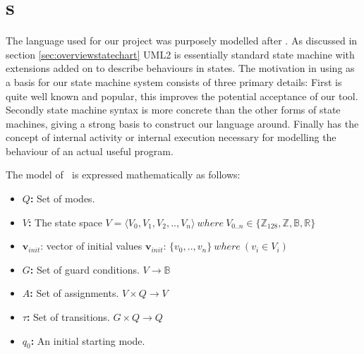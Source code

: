 \section{\plcchart s}
\label{sec:statechartsem}

The language used for our project was purposely modelled after \cite{UML2}. As discussed in section \ref{sec:overviewstatechart} UML2 is essentially standard state machine with extensions added on to describe behaviours in states. The motivation in using \cite{UML2} as a basis for our state machine system consists of three primary details: First \cite{UML2} is quite well known and popular, this improves the potential acceptance of our tool. Secondly \cite{UML2} state machine syntax is more concrete than the other forms of state machines, giving a strong basis to construct our language around. Finally \cite{UML2} has the concept of internal activity or internal execution necessary for modelling the behaviour of an actual useful program.

The model of \plcchart $\:$ is expressed mathematically as follows:

\begin{definition}
	\plcchart
	
\begin{itemize}
	\item \textbf{$Q$:} Set of modes.
	\item \textbf{$V$:} The state space $V = \langle V_0,V_1,V_2,..,V_n \rangle \: where \: V_{0..n}\in \lbrace \mathbb{Z}_{128}, \mathbb{Z}, \mathbb{B}, \mathbb{R} \rbrace$
	\item $\mathbf{v}_{init}$: vector of initial values $\mathbf{v}_{init}$: $\lbrace v_0,..,v_n \rbrace \: where \: (v_i \in V_i)$
	\item \textbf{$G$:} Set of guard conditions. $V \rightarrow \mathbb{B}$
	\item \textbf{$A$:} Set of assignments. $V \times Q \rightarrow V$
	\item \textbf{$\tau$:} Set of transitions. $G \times Q \rightarrow Q$
	\item \textbf{$q_0$:} An initial starting mode.
\end{itemize}
\end{definition}

